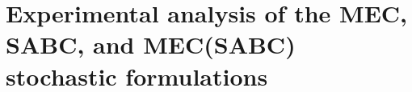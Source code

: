 \section{Experimental analysis of the MEC, SABC, and MEC(SABC) stochastic formulations} \label{obj val}

%
%
